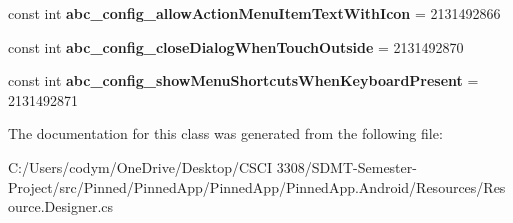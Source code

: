 \begin{DoxyCompactItemize}
const int {\bfseries abc\+\_\+config\+\_\+allow\+Action\+Menu\+Item\+Text\+With\+Icon} = 2131492866
\item 
\mbox{\label{class_pinned_app_1_1_droid_1_1_resource_1_1_boolean_a24c0bd7855b90c7d2ab98028d916c12e}} 
const int {\bfseries abc\+\_\+config\+\_\+close\+Dialog\+When\+Touch\+Outside} = 2131492870
\item 
\mbox{\label{class_pinned_app_1_1_droid_1_1_resource_1_1_boolean_a033cb38fb7c7ea6abaf4a4ee7cae9049}} 
const int {\bfseries abc\+\_\+config\+\_\+show\+Menu\+Shortcuts\+When\+Keyboard\+Present} = 2131492871
\end{DoxyCompactItemize}


The documentation for this class was generated from the following file\+:\begin{DoxyCompactItemize}
\item 
C\+:/\+Users/codym/\+One\+Drive/\+Desktop/\+C\+S\+C\+I 3308/\+S\+D\+M\+T-\/\+Semester-\/\+Project/src/\+Pinned/\+Pinned\+App/\+Pinned\+App/\+Pinned\+App.\+Android/\+Resources/Resource.\+Designer.\+cs\end{DoxyCompactItemize}
